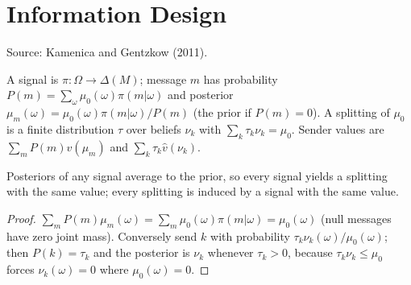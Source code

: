\chapter{Information Design}
\label{chap:information}

Source: Kamenica and Gentzkow (2011).

\begin{definition}
\label{def:info-signal}
\leanok
A signal is $\pi:\Omega\to\Delta(M)$; message $m$ has probability $P(m)=\sum_\omega\mu_0(\omega)\pi(m|\omega)$ and
posterior $\mu_m(\omega)=\mu_0(\omega)\pi(m|\omega)/P(m)$ (the prior if $P(m)=0$). A splitting of $\mu_0$ is a finite
distribution $\tau$ over beliefs $\nu_k$ with $\sum_k\tau_k\nu_k=\mu_0$. Sender values are $\sum_mP(m)\hat v(\mu_m)$ and
$\sum_k\tau_k\hat v(\nu_k)$.
\end{definition}

\begin{theorem}
\label{thm:info-bp}
\leanok
{}
Posteriors of any signal average to the prior, so every signal yields a splitting with the same value; every
splitting is induced by a signal with the same value.
\end{theorem}
\begin{proof}
\leanok
$\sum_mP(m)\mu_m(\omega)=\sum_m\mu_0(\omega)\pi(m|\omega)=\mu_0(\omega)$ (null messages have zero joint mass). Conversely
send $k$ with probability $\tau_k\nu_k(\omega)/\mu_0(\omega)$; then $P(k)=\tau_k$ and the posterior is $\nu_k$ whenever
$\tau_k>0$, because $\tau_k\nu_k\le\mu_0$ forces $\nu_k(\omega)=0$ where $\mu_0(\omega)=0$.
\end{proof}

